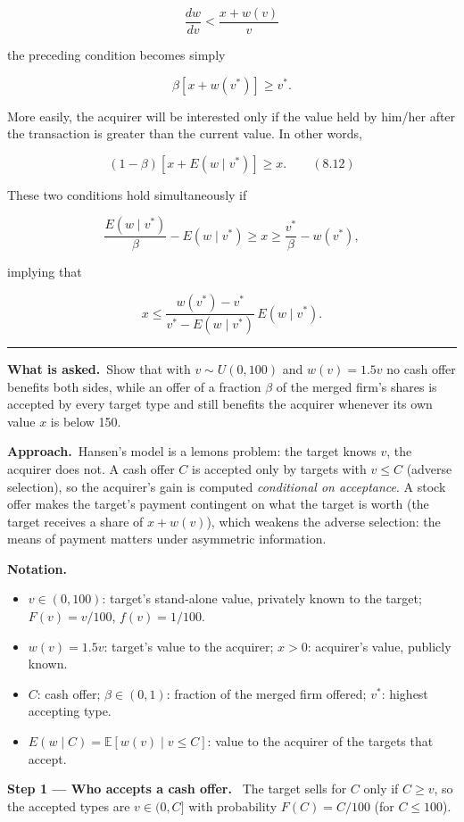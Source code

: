 \documentclass[11pt,a4paper]{article}
\newcommand{\notation}{\par\noindent\textbf{Notation.}}
\newcommand{\step}[2]{\par\medskip\noindent\textbf{Step #1 --- #2.}~}
\newcommand{\asked}{\par\medskip\noindent\textbf{What is asked.}~}
\newcommand{\approach}{\par\smallskip\noindent\textbf{Approach.}~}
\newcommand{\E}{\mathbb{E}}
\newcommand{\stmtend}{\par\endgroup\nopagebreak\noindent\rule{\linewidth}{0.4pt}\par\medskip}
\begin{document}
\[\frac{dw}{dv} < \frac{x + w(v)}{v}\]

the preceding condition becomes simply

\[\beta[x + w(v^*)] \geq v^*.\]

More easily, the acquirer will be interested only if the value held by him/her after the transaction
is greater than the current value. In other words,

\[(1 - \beta)[x + E(w \mid v^*)] \geq x. \qquad (8.12)\]

These two conditions hold simultaneously if

\[\frac{E(w \mid v^*)}{\beta} - E(w \mid v^*) \geq x \geq \frac{v^*}{\beta} - w(v^*),\]

implying that

\[x \leq \frac{w(v^*) - v^*}{v^* - E(w \mid v^*)}\, E(w \mid v^*).\]
\stmtend

\asked Show that with $v\sim U(0,100)$ and $w(v)=1.5v$ no cash offer benefits both sides, while an
offer of a fraction $\beta$ of the merged firm's shares is accepted by every target type and still
benefits the acquirer whenever its own value $x$ is below 150.

\approach Hansen's model is a lemons problem: the target knows $v$, the acquirer does not. A cash offer
$C$ is accepted only by targets with $v\le C$ (adverse selection), so the acquirer's gain is computed
\emph{conditional on acceptance}. A stock offer makes the target's payment contingent on what the
target is worth (the target receives a share of $x+w(v)$), which weakens the adverse selection: the
means of payment matters under asymmetric information.

\notation
\begin{itemize}
  \item $v\in(0,100)$: target's stand-alone value, privately known to the target; $F(v)=v/100$, $f(v)=1/100$.
  \item $w(v)=1.5v$: target's value to the acquirer; $x>0$: acquirer's value, publicly known.
  \item $C$: cash offer; $\beta\in(0,1)$: fraction of the merged firm offered; $v^*$: highest accepting type.
  \item $E(w\mid C)=\E[w(v)\mid v\le C]$: value to the acquirer of the targets that accept.
\end{itemize}

\step{1}{Who accepts a cash offer} The target sells for $C$ only if $C\ge v$, so the accepted types are
$v\in(0,C]$ with probability $F(C)=C/100$ (for $C\le 100$).
\end{document}
